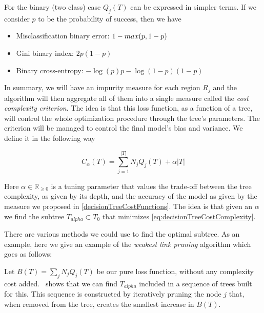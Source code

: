 For the binary (two class) case $Q_j(T)$ can be expressed in simpler terms. If we consider $p$ to be the probability of success, then we have

\begin{itemize}
\item Misclassification binary error: $1 - \\max(p, 1-p)$
\item Gini binary index: $ 2p(1-p) $
\item Binary cross-entropy: $ -\log(p)p - \log(1- p)(1-p) $
\end{itemize}\label{decisionTreeCostFunctions}

In summary, we will have an impurity measure for each region $R_j$ and the algorithm will then aggregate all of them into a single measure called the \textit{cost complexity criterion}. The idea is that this loss function, as a function of a tree, will control the whole optimization procedure through the tree's parameters. The criterion will be managed to control the final model's bias and variance. We define it in the following way

\begin{equation}
C_\alpha(T) = \sum_{j=1}^{|T|} N_j Q_j(T) + \alpha|T|
\end{equation}\label{eq:decisionTreeCostComplexity}


Here $\alpha \in \mathbb{R}_{\geq 0}$ is a tuning parameter that values the trade-off between the tree complexity, as given by its depth, and the accuracy of the model as given by the measure we proposed in \cref{decisionTreeCostFunctions}. The idea is that given an $\alpha$ we find the subtree $T_{alpha} \subset T_0$ that minimizes \cref{eq:decisionTreeCostComplexity}.

There are various methods we could use to find the optimal subtree. As an example, here we give an example of the \textit{weakest link pruning} algorithm which goes as follows:

Let $B(T) = \sum_{j} N_j Q_j(T) $ be our pure loss function, without any complexity cost added.~\cite{breiman-cart84} shows that we can find $T_{alpha}$ included in a sequence of trees built for this. This sequence is constructed by iteratively pruning the node $j$ that, when removed from the tree, creates the smallest increase in $B(T)$.




